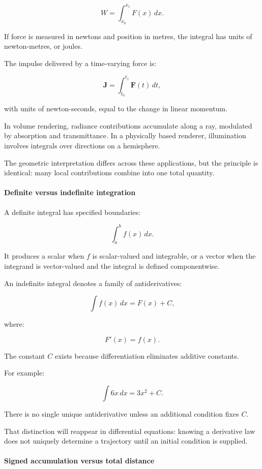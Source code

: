 \[
W=\int_{x_0}^{x_1}F(x)\,dx.
\]

If force is measured in newtons and position in metres, the integral has units of newton-metres, or joules.

The impulse delivered by a time-varying force is:

\[
\mathbf J=\int_{t_0}^{t_1}\mathbf F(t)\,dt,
\]

with units of newton-seconds, equal to the change in linear momentum.

In volume rendering, radiance contributions accumulate along a ray, modulated by absorption and transmittance. In a physically based renderer, illumination involves integrals over directions on a hemisphere.

The geometric interpretation differs across these applications, but the principle is identical: many local contributions combine into one total quantity.

\paragraph{Definite versus indefinite integration}\label{02-foundations-ii-ch022-definite-versus-indefinite-integration}

A definite integral has specified boundaries:

\[
\int_a^b f(x)\,dx.
\]

It produces a scalar when \(f\) is scalar-valued and integrable, or a vector when the integrand is vector-valued and the integral is defined componentwise.

An indefinite integral denotes a family of antiderivatives:

\[
\int f(x)\,dx=F(x)+C,
\]

where:

\[
F'(x)=f(x).
\]

The constant \(C\) exists because differentiation eliminates additive constants.

For example:

\[
\int 6x\,dx=3x^2+C.
\]

There is no single unique antiderivative unless an additional condition fixes \(C\).

That distinction will reappear in differential equations: knowing a derivative law does not uniquely determine a trajectory until an initial condition is supplied.

\paragraph{Signed accumulation versus total distance}\label{02-foundations-ii-ch022-signed-accumulation-versus-total-distance}

